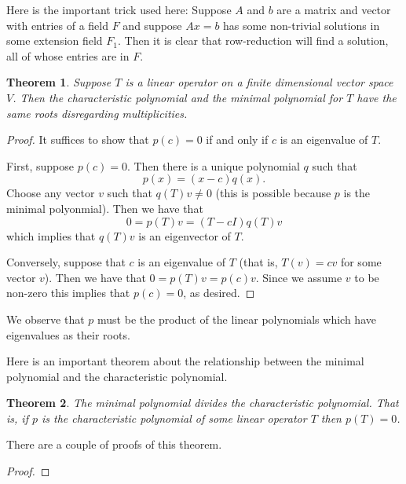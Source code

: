 \documentclass[12pt]{article}
\theoremstyle{plain}
\newtheorem{thm}{Theorem}
\theoremstyle{definition}
\begin{document}
Here is the important trick used here: Suppose $A$ and $b$ are a matrix and vector with entries of a field $F$ and suppose $Ax = b$ has some non-trivial solutions in some extension field $F_1$. Then it is clear that row-reduction will find a solution, all of whose entries are in $F$.

\begin{thm}
Suppose $T$ is a linear operator on a finite dimensional vector space $V$. Then the characteristic polynomial and the minimal polynomial for $T$ have the same roots disregarding multiplicities.
\end{thm}

\begin{proof}
It suffices to show that $p(c) = 0$ if and only if $c$ is an eigenvalue of $T$. 

First, suppose $p(c) = 0$. Then there is a unique polynomial $q$ such that \[p(x) = (x - c)q(x).\] Choose any vector $v$ such that $q(T)v \neq 0$ (this is possible because $p$ is the minimal polyonmial). Then we have that 
\[0 = p(T)v = (T - cI)q(T)v\] which implies that $q(T)v$ is an eigenvector of $T$.

Conversely, suppose that $c$ is an eigenvalue of $T$ (that is, $T(v) = cv$ for some vector $v$). Then we have that $0 = p(T)v = p(c)v$. Since we assume $v$ to be non-zero this implies that $p(c) = 0$, as desired. 
\end{proof}

We observe that $p$ must be the product of the linear polynomials which have eigenvalues as their roots.

Here is an important theorem about the relationship between the minimal polynomial and the characteristic polynomial.

\begin{thm}
The minimal polynomial divides the characteristic polynomial. That is, if $p$ is the characteristic polynomial of some linear operator $T$ then $p(T) = 0$.
\end{thm}

There are a couple of proofs of this theorem.

\begin{proof}

\end{proof}
\end{document}
